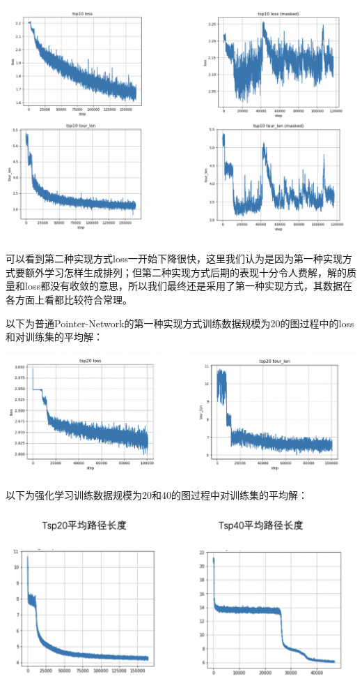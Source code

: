 \documentclass[a4paper]{article}
\begin{document}
\includegraphics[width=\textwidth]{../fig/pic3.png}

可以看到第二种实现方式loss一开始下降很快，这里我们认为是因为第一种实现方式要额外学习怎样生成排列；但第二种实现方式后期的表现十分令人费解，解的质量和loss都没有收敛的意思，所以我们最终还是采用了第一种实现方式，其数据在各方面上看都比较符合常理。

以下为普通Pointer-Network的第一种实现方式训练数据规模为20的图过程中的loss和对训练集的平均解：

\includegraphics[width=\textwidth]{../fig/pic4.png}

以下为强化学习训练数据规模为20和40的图过程中对训练集的平均解：

\includegraphics[width=\textwidth]{../fig/pic5.png}
\end{document}
